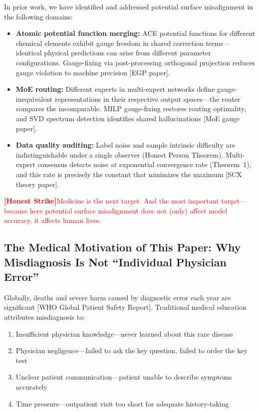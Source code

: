 \documentclass[12pt,a4paper]{article}
\theoremstyle{remark}
\newcommand{\honestcrit}[1]{%
    \textcolor{red}{\textbf{[Honest Strike]}#1}%
}
\begin{document}
In prior work, we have identified and addressed potential surface misalignment in the following domains:
\begin{itemize}
    \item \textbf{Atomic potential function merging:} ACE potential functions for different chemical elements exhibit gauge freedom in shared correction terms---identical physical predictions can arise from different parameter configurations. Gauge-fixing via post-processing orthogonal projection reduces gauge violation to machine precision [EGP paper].
    \item \textbf{MoE routing:} Different experts in multi-expert networks define gauge-inequivalent representations in their respective output spaces---the router compares the incomparable. MILP gauge-fixing restores routing optimality, and SVD spectrum detection identifies shared hallucinations [MoE gauge paper].
    \item \textbf{Data quality auditing:} Label noise and sample intrinsic difficulty are indistinguishable under a single observer (Honest Person Theorem). Multi-expert consensus detects noise at exponential convergence rate (Theorem~1), and this rate is precisely the constant that minimizes the maximum [SCX theory paper].
\end{itemize}

\honestcrit{Medicine is the next target. And the most important target---because here potential surface misalignment does not (only) affect model accuracy, it affects human lives.}

\subsection{The Medical Motivation of This Paper: Why Misdiagnosis Is Not ``Individual Physician Error''}

Globally, deaths and severe harm caused by diagnostic error each year are significant [WHO Global Patient Safety Report]. Traditional medical education attributes misdiagnosis to:
\begin{enumerate}[label=(\arabic*)]
    \item Insufficient physician knowledge---never learned about this rare disease
    \item Physician negligence---failed to ask the key question, failed to order the key test
    \item Unclear patient communication---patient unable to describe symptoms accurately
    \item Time pressure---outpatient visit too short for adequate history-taking
\end{enumerate}
\end{document}
